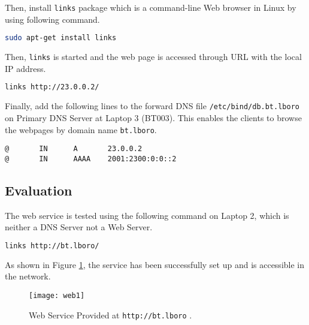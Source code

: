 Then, install \texttt{links} package which is a command-line Web browser in Linux by using following command.

\begin{lstlisting}[language=sh]
sudo apt-get install links
\end{lstlisting}


Then, \texttt{links} is started and the web page is accessed through URL with the local IP address.

\begin{lstlisting}[language=sh]
links http://23.0.0.2/
\end{lstlisting}

Finally, add the following lines to the forward DNS file \texttt{/etc/bind/db.bt.lboro} on Primary DNS Server at Laptop 3 (BT003). This enables the clients to browse the webpages by domain name \texttt{bt.lboro}.

\begin{lstlisting}
@		IN		A		23.0.0.2
@		IN		AAAA	2001:2300:0:0::2
\end{lstlisting}


\subsection{Evaluation}

The web service is tested using the following command on Laptop 2, which is neither a DNS Server not a Web Server.

\begin{lstlisting}[language=sh]
links http://bt.lboro/
\end{lstlisting}

As shown in Figure \ref{fig:web1}, the service has been successfully set up and is accessible in the network.

\begin{figure}[ht!]
    \centering
    \texttt{[image: web1]}
    \caption{Web Service Provided at \texttt{http://bt.lboro} .}
    \label{fig:web1}
\end{figure}




